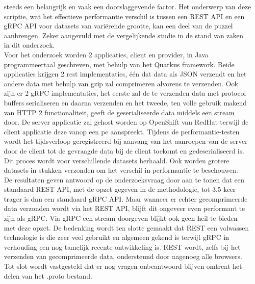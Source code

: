 steeds een belangrijk en vaak een doorslaggevende factor.
Het onderwerp van deze scriptie, wat het effectieve performantie verschil is tussen een REST API en een gRPC API voor
datasets van variërende grootte, kan een deel van de puzzel aanbrengen. Zeker aangevuld met de vergelijkende studie in de stand van zaken in dit onderzoek.\\
Voor het onderzoek worden 2 applicaties, client en provider, in Java programmeertaal geschreven, met behulp van het Quarkus framework.
Beide applicaties krijgen 2 rest implementaties, één dat data als JSON verzendt en het andere data met behulp van gzip zal comprimeren alvorens te verzenden.
Ook zijn er 2 gRPC implementaties, het eerste zal de te verzenden data met protocol buffers serialiseren en daarna verzenden en het tweede,
ten volle gebruik makend van HTTP 2 functionaliteit, geeft de geserialiseerde data middels een stream door.
De server applicatie zal gehost worden op OpenShift van RedHat terwijl de client applicatie deze vanop een pc aanspreekt.
Tijdens de performantie-testen wordt het tijdsverloop geregistreerd bij aanvang van het aanroepen van de server door de client
tot de gevraagde data bij de client toekomt en gedeserialiseerd is. Dit proces wordt voor verschillende datasets herhaald.
Ook worden grotere datasets in stukken verzonden om het verschil in performantie te beschouwen.\\
De resultaten geven antwoord op de onderzoeksvraag door aan te tonen dat een standaard REST API, met de opzet gegeven in de methodologie,
tot 3,5 keer trager is dan een standaard gRPC API. Maar wanneer er echter gecomprimeerde data verzonden wordt via het REST API, blijft dit ongeveer even performant te zijn als gRPC.
Via gRPC een stream doorgeven blijkt ook geen heil te bieden met deze opzet.
De bedenking wordt ten slotte gemaakt dat REST een volwassen technologie is die zeer veel gebruikt en algemeen gekend is terwijl gRPC in verhouding een nog tamelijk recente ontwikkeling is.
REST wordt, zelfs bij het verzenden van gecomprimeerde data, ondersteund door nagenoeg alle browsers.
Tot slot wordt vastgesteld dat er nog vragen onbeantwoord blijven omtrent het delen van het .proto bestand.